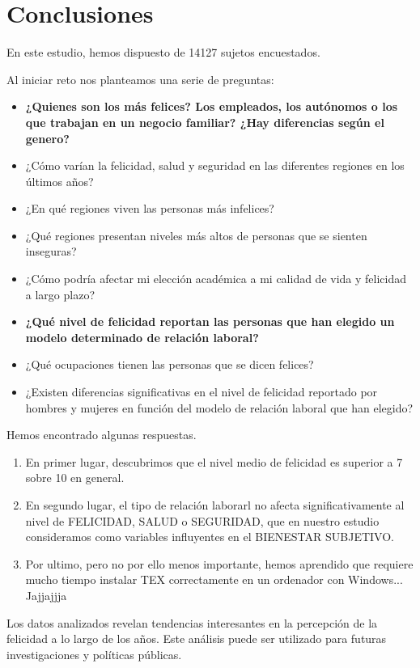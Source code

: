 \documentclass{report}
\begin{document}
\section*{Conclusiones}

En este estudio, hemos dispuesto de 14127 sujetos encuestados.

Al iniciar reto nos planteamos una serie de preguntas:

\begin{itemize}
\item \textbf{¿Quienes son los más felices? Los empleados, los autónomos o los que trabajan en un negocio
familiar? ¿Hay diferencias según el genero?}
\item ¿Cómo varían la felicidad, salud y seguridad en las diferentes regiones en los últimos años?
\item ¿En qué regiones viven las personas más infelices?
\item ¿Qué regiones presentan niveles más altos de personas que se sienten inseguras?
\item ¿Cómo podría afectar mi elección académica a mi calidad de vida y felicidad a largo plazo?
\item \textbf{¿Qué nivel de felicidad reportan las personas que han elegido un modelo determinado de relación
laboral?}
\item ¿Qué ocupaciones tienen las personas que se dicen felices? 
\item ¿Existen diferencias significativas en el nivel de felicidad reportado por hombres y mujeres en
función del modelo de relación laboral que han elegido?
\end{itemize}

Hemos encontrado algunas respuestas. 

\begin{enumerate}
\item En primer lugar, descubrimos que el nivel medio de felicidad es superior a 7 sobre 10 en general.
\item En segundo lugar, el tipo de relación laborarl no afecta significativamente al nivel de FELICIDAD, SALUD o SEGURIDAD, que en nuestro estudio consideramos como variables influyentes en el BIENESTAR SUBJETIVO.
\item Por ultimo, pero no por ello menos importante, hemos aprendido que requiere mucho tiempo instalar TEX correctamente en un ordenador con Windows... Jajjajjja
\end{enumerate}

Los datos analizados revelan tendencias interesantes en la percepción de la felicidad a lo largo de los años. Este análisis puede ser utilizado para futuras investigaciones y políticas públicas.
\end{document}

